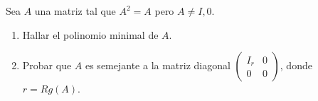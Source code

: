 \item Sea $A$ una matriz tal que $A^2=A$ pero $A\neq I,0$.
    \begin{enumerate}
        \item Hallar el polinomio minimal de $A$.
            \begin{mdframed}[style=s]
                
            \end{mdframed}
        \item Probar que $A$ es semejante a la matriz diagonal $\begin{pmatrix}
                I_r&0\\0&0
            \end{pmatrix}$, donde $r=Rg(A)$.
            \begin{mdframed}[style=s]
                
            \end{mdframed}
    \end{enumerate}